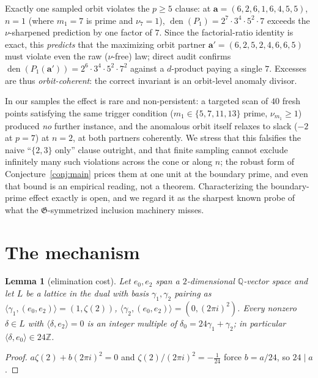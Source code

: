 \documentclass[11pt]{article}
\newtheorem{lemma}[theorem]{Lemma}
\theoremstyle{definition}
\newcommand{\den}{\operatorname{den}}
\newcommand{\Z}{\mathbb{Z}}
\newcommand{\Q}{\mathbb{Q}}
\newcommand{\frG}{\mathfrak{G}}
\begin{document}
Exactly one sampled orbit violates the $p\ge5$ clause: at
$\mathbf a=(6,2,6,1,6,4,5,5)$, $n=1$ (where $m_1=7$ is prime and
$\nu_7=1$), $\den(P_1)=2^7\cdot3^4\cdot5^2\cdot7$ exceeds the
$\nu$-sharpened prediction by one factor of $7$. Since the
factorial-ratio identity is exact, this \emph{predicts} that the
maximizing orbit partner $\mathbf a'=(6,2,5,2,4,6,6,5)$ must violate
even the raw ($\nu$-free) law; direct audit confirms
$\den(P_1(\mathbf a'))=2^6\cdot3^4\cdot5^2\cdot7^2$ against a
$d$-product paying a single $7$. Excesses are thus \emph{orbit-coherent}:
the correct invariant is an orbit-level anomaly divisor.

In our samples the effect is rare and non-persistent: a targeted scan
of $40$ fresh points satisfying the same trigger condition
($m_1\in\{5,7,11,13\}$ prime, $\nu_{m_1}\ge1$) produced \emph{no}
further instance, and the anomalous orbit itself relaxes to slack ($-2$
at $p=7$) at $n=2$, at both partners coherently. We stress that this
falsifies the naive ``$\{2,3\}$ only'' clause outright, and that finite
sampling cannot exclude infinitely many such violations across the cone
or along $n$; the robust form of Conjecture~\ref{conj:main} prices them
at one unit at the boundary prime, and even that bound is an empirical
reading, not a theorem. Characterizing the boundary-prime effect exactly
is open, and we regard it as the sharpest known probe of what the
$\frG$-symmetrized inclusion machinery misses.

\section{The mechanism}\label{sec:mechanism}

\begin{lemma}[elimination cost]\label{lem:cost}
Let $e_0,e_2$ span a $2$-dimensional $\Q$-vector space and let
$L$ be a lattice in the dual with basis $\gamma_1,\gamma_2$ pairing as
$\langle\gamma_1,(e_0,e_2)\rangle=(1,\zeta(2))$,
$\langle\gamma_2,(e_0,e_2)\rangle=(0,(2\pi i)^2)$. Every nonzero
$\delta\in L$ with $\langle\delta,e_2\rangle=0$ is an integer multiple
of $\delta_0=24\gamma_1+\gamma_2$; in particular
$\langle\delta,e_0\rangle\in24\Z$.
\end{lemma}

\begin{proof}
$a\zeta(2)+b(2\pi i)^2=0$ and $\zeta(2)/(2\pi i)^2=-\tfrac1{24}$ force
$b=a/24$, so $24\mid a$.
\end{proof}
\end{document}

